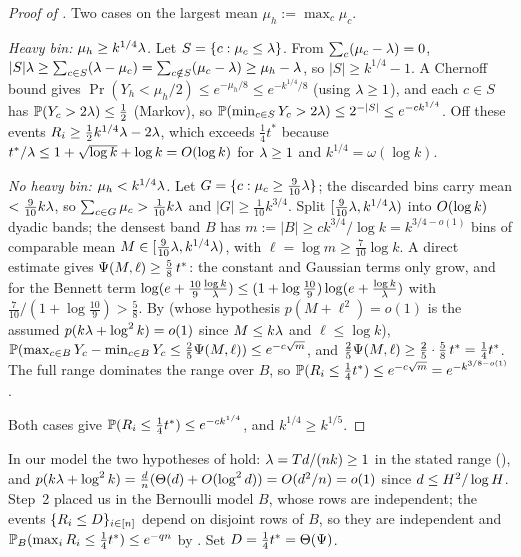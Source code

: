\begin{proof}[Proof of ]
Two cases on the largest mean $\mu_h:=\max_c\mu_c$.

\emph{Heavy bin: $\mu_h\ge k^{1/4}\lambda$.} Let $S=\{c:\mu_c\le\lambda\}$. From $\sum_c(\mu_c-\lambda)=0$,
$|S|\lambda\ge\sum_{c\in S}(\lambda-\mu_c)=\sum_{c\notin S}(\mu_c-\lambda)\ge\mu_h-\lambda$, so $|S|\ge k^{1/4}-1$. A Chernoff bound gives
$\Pr(Y_h<\mu_h/2)\le e^{-\mu_h/8}\le e^{-k^{1/4}/8}$ (using $\lambda\ge1$), and each $c\in S$ has $\mathbb{P}(Y_c>2\lambda)\le\tfrac12$
(Markov), so $\mathbb{P}(\min_{c\in S}Y_c>2\lambda)\le 2^{-|S|}\le e^{-ck^{1/4}}$. Off these events $R_i\ge\tfrac12 k^{1/4}\lambda-2\lambda$,
which exceeds $\tfrac14 t^*$ because $t^*/\lambda\le 1+\sqrt{\log k}+\log k=O(\log k)$ for $\lambda\ge1$ and $k^{1/4}=\omega(\log k)$.

\emph{No heavy bin: $\mu_h<k^{1/4}\lambda$.} Let $G=\{c:\mu_c\ge\tfrac{9}{10}\lambda\}$; the discarded bins carry mean
$<\tfrac{9}{10}k\lambda$, so $\sum_{c\in G}\mu_c>\tfrac1{10}k\lambda$ and $|G|\ge\tfrac1{10}k^{3/4}$. Split
$[\tfrac{9}{10}\lambda,k^{1/4}\lambda)$ into $O(\log k)$ dyadic bands; the densest band $B$ has $m:=|B|\ge ck^{3/4}/\log k=k^{3/4-o(1)}$
bins of comparable mean $M\in[\tfrac{9}{10}\lambda,k^{1/4}\lambda)$, with $\ell=\log m\ge\tfrac{7}{10}\log k$. A direct estimate gives
$\Psi(M,\ell)\ge\tfrac58\,t^*$: the constant and Gaussian terms only grow, and for the Bennett term
$\log(e+\tfrac{10}{9}\tfrac{\log k}{\lambda})\le(1+\log\tfrac{10}{9})\log(e+\tfrac{\log k}{\lambda})$ with
$\tfrac{7}{10}/(1+\log\tfrac{10}{9})>\tfrac58$. By  (whose hypothesis $p(M+\ell^2)=o(1)$ is the assumed
$p(k\lambda+\log^2 k)=o(1)$ since $M\le k\lambda$ and $\ell\le\log k$),
$\mathbb{P}(\max_{c\in B}Y_c-\min_{c\in B}Y_c\le\tfrac25\Psi(M,\ell))\le e^{-c\sqrt m}$, and
$\tfrac25\Psi(M,\ell)\ge\tfrac25\cdot\tfrac58\,t^*=\tfrac14 t^*$. The full range dominates the range over $B$, so
$\mathbb{P}(R_i\le\tfrac14 t^*)\le e^{-c\sqrt m}=e^{-k^{3/8-o(1)}}$.

Both cases give $\mathbb{P}(R_i\le\tfrac14 t^*)\le e^{-ck^{1/4}}$, and $k^{1/4}\ge k^{1/5}$.
\end{proof}

In our model the two hypotheses of  hold: $\lambda=Td/(nk)\ge1$ in the stated range (),
and $p(k\lambda+\log^2 k)=\tfrac dn(\Theta(d)+O(\log^2 d))=O(d^2/n)=o(1)$ since $d\le H^2/\log H$. Step~2 placed us in
the Bernoulli model $B$, whose rows are independent; the events $\{R_i\le D\}_{i\in[n]}$ depend on disjoint rows of
$B$, so they are independent and $\mathbb{P}_B(\max_iR_i\le\tfrac14 t^*)\le e^{-qn}$ by . Set
$D=\tfrac14 t^*=\Theta(\Psi)$.


